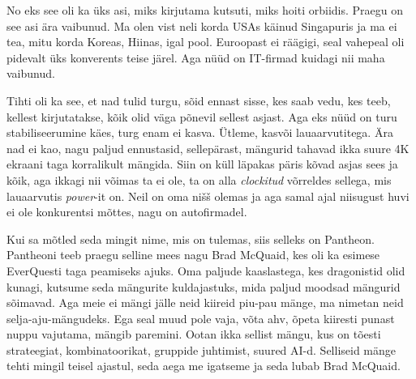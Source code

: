 No eks see oli ka üks asi, miks kirjutama kutsuti, miks hoiti orbiidis. Praegu 
on see asi ära vaibunud. Ma olen vist neli korda USAs käinud Singapuris ja ma 
ei tea, mitu korda Koreas, Hiinas, igal pool. Euroopast ei räägigi, seal 
vahepeal oli pidevalt üks konverents teise järel. Aga nüüd on  IT-firmad 
kuidagi nii maha vaibunud. 
                 

Tihti oli ka see, et nad tulid turgu, sõid ennast sisse, kes saab vedu, kes 
teeb, kellest kirjutatakse, kõik olid väga põnevil sellest asjast. Aga eks nüüd 
on turu stabiliseerumine  käes, turg enam ei kasva. Ütleme, kasvõi 
lauaarvutitega. Ära nad ei kao, nagu paljud ennustasid, sellepärast, mängurid 
tahavad ikka suure 4K ekraani taga korralikult mängida. Siin on küll läpakas 
päris kõvad asjas sees ja kõik, aga ikkagi nii võimas ta ei ole, ta on alla 
\emph{clockitud} võrreldes sellega, mis lauaarvutis \emph{power}-it on. Neil on 
oma nišš olemas ja aga samal ajal niisugust huvi ei ole konkurentsi mõttes, 
nagu on autofirmadel.
                 

Kui sa mõtled seda mingit nime, mis on tulemas, siis selleks on 
Pantheon. Pantheoni teeb praegu selline mees nagu Brad McQuaid, kes oli ka 
esimese EverQuesti taga peamiseks ajuks. Oma paljude 
kaaslastega, kes dragonistid olid kunagi, kutsume seda mängurite kuldajastuks, 
mida paljud moodsad mängurid sõimavad. Aga meie ei mängi jälle neid kiireid 
piu-pau mänge, ma nimetan neid selja-aju-mängudeks. Ega seal muud pole vaja, 
võta ahv, õpeta kiiresti punast nuppu vajutama, mängib paremini. Ootan ikka 
sellist mängu, kus on tõesti strateegiat, kombinatoorikat, gruppide juhtimist, 
suured AI-d. Selliseid mänge tehti mingil teisel ajastul, seda aega me igatseme 
ja seda lubab Brad McQuaid. 

